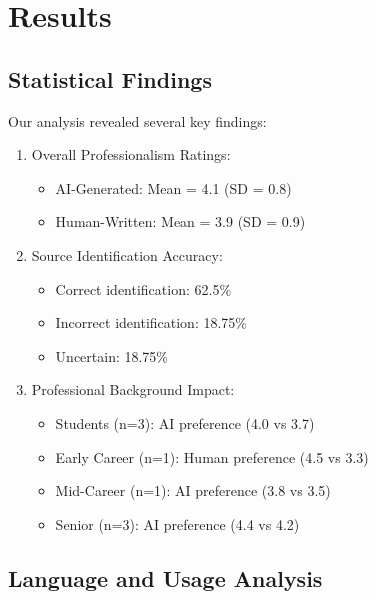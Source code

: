 \documentclass[
  letterpaper,
  DIV=11,
  numbers=noendperiod]{scrartcl}
\providecommand{\tightlist}{%
  \setlength{\itemsep}{0pt}\setlength{\parskip}{0pt}}\usepackage{longtable,booktabs,array}
\begin{document}
\section{Results}\label{results}

\subsection{Statistical Findings}\label{statistical-findings}

Our analysis revealed several key findings:

\begin{enumerate}
\def\labelenumi{\arabic{enumi}.}
\tightlist
\item
  Overall Professionalism Ratings:

  \begin{itemize}
  \tightlist
  \item
    AI-Generated: Mean = 4.1 (SD = 0.8)
  \item
    Human-Written: Mean = 3.9 (SD = 0.9)
  \end{itemize}
\item
  Source Identification Accuracy:

  \begin{itemize}
  \tightlist
  \item
    Correct identification: 62.5\%
  \item
    Incorrect identification: 18.75\%
  \item
    Uncertain: 18.75\%
  \end{itemize}
\item
  Professional Background Impact:

  \begin{itemize}
  \tightlist
  \item
    Students (n=3): AI preference (4.0 vs 3.7)
  \item
    Early Career (n=1): Human preference (4.5 vs 3.3)
  \item
    Mid-Career (n=1): AI preference (3.8 vs 3.5)
  \item
    Senior (n=3): AI preference (4.4 vs 4.2)
  \end{itemize}
\end{enumerate}

\subsection{Language and Usage
Analysis}\label{language-and-usage-analysis}
\end{document}
